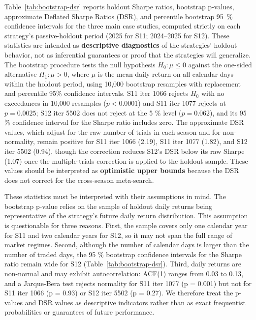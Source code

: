 \documentclass[analytics,article,submit,pdftex,moreauthors]{Definitions/mdpi}
\begin{document}
Table~\ref{tab:bootstrap-dsr} reports holdout Sharpe ratios, bootstrap p-values, approximate Deflated Sharpe Ratios (DSR), and percentile bootstrap 95~\% confidence intervals for the three main case studies, computed strictly on each strategy's passive-holdout period (2025 for S11; 2024--2025 for S12). These statistics are intended as \textbf{descriptive diagnostics} of the strategies' holdout behavior, not as inferential guarantees or proof that the strategies will generalize. The bootstrap procedure tests the null hypothesis \(H_0: \mu \le 0\) against the one-sided alternative \(H_1: \mu > 0\), where \(\mu\) is the mean daily return on all calendar days within the holdout period, using 10,000 bootstrap resamples with replacement and percentile 95\% confidence intervals. S11 iter 1066 rejects \(H_0\) with no exceedances in 10,000 resamples (\(p < 0.0001\)) and S11 iter 1077 rejects at \(p = 0.0025\); S12 iter 5502 does not reject at the 5 \% level (\(p = 0.062\)), and its 95 \% confidence interval for the Sharpe ratio includes zero. The approximate DSR values, which adjust for the raw number of trials in each season and for non-normality, remain positive for S11 iter 1066 (2.19), S11 iter 1077 (1.82), and S12 iter 5502 (0.94), though the correction reduces S12's DSR below its raw Sharpe (1.07) once the multiple-trials correction is applied to the holdout sample. These values should be interpreted as \textbf{optimistic upper bounds} because the DSR does not correct for the cross-season meta-search.

These statistics must be interpreted with their assumptions in mind. The bootstrap p-value relies on the sample of holdout daily returns being representative of the strategy's future daily return distribution. This assumption is questionable for three reasons. First, the sample covers only one calendar year for S11 and two calendar years for S12, so it may not span the full range of market regimes. Second, although the number of calendar days is larger than the number of traded days, the 95 \% bootstrap confidence intervals for the Sharpe ratio remain wide for S12 (Table~\ref{tab:bootstrap-dsr}). Third, daily returns are non-normal and may exhibit autocorrelation: ACF(1) ranges from 0.03 to 0.13, and a Jarque-Bera test rejects normality for S11 iter 1077 (p = 0.001) but not for S11 iter 1066 (p = 0.93) or S12 iter 5502 (p = 0.27). We therefore treat the p-values and DSR values as descriptive indicators rather than as exact frequentist probabilities or guarantees of future performance.
\end{document}

